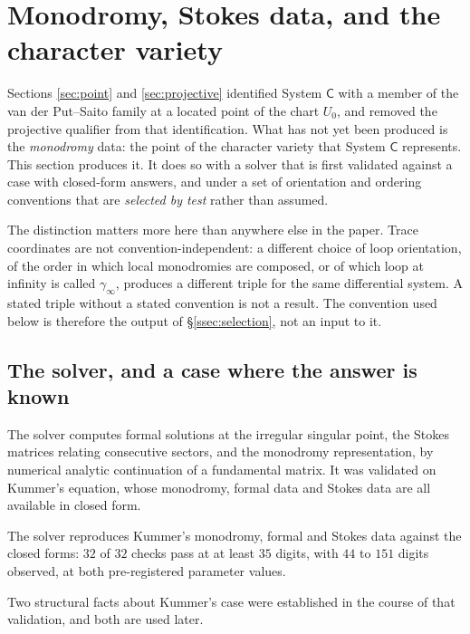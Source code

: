 \section{Monodromy, Stokes data, and the character variety}\label{sec:monodromy}

Sections \ref{sec:point} and \ref{sec:projective} identified System $\mathsf C$
with a member of the van der Put--Saito family at a located point of the chart
$U_0$, and removed the projective qualifier from that identification. What has
not yet been produced is the \emph{monodromy} data: the point of the character
variety that System $\mathsf C$ represents. This section produces it. It does
so with a solver that is first validated against a case with closed-form
answers, and under a set of orientation and ordering conventions that are
\emph{selected by test} rather than assumed.

The distinction matters more here than anywhere else in the paper. Trace
coordinates are not convention-independent: a different choice of loop
orientation, of the order in which local monodromies are composed, or of which
loop at infinity is called $\gamma_\infty$, produces a different triple for the
same differential system. A stated triple without a stated convention is not a
result. The convention used below is therefore the output of
\S\ref{ssec:selection}, not an input to it.

\subsection{The solver, and a case where the answer is
known}\label{ssec:kummer}

The solver computes formal solutions at the irregular singular point, the
Stokes matrices relating consecutive sectors, and the monodromy
representation, by numerical analytic continuation of a fundamental matrix. It
was validated on Kummer's equation, whose monodromy, formal data and Stokes
data are all available in closed form.

\begin{remark}
The solver reproduces Kummer's monodromy, formal and Stokes data against the
closed forms: $32$ of $32$ checks pass at at least $35$ digits, with $44$ to
$151$ digits observed, at both pre-registered parameter values.
\end{remark}

Two structural facts about Kummer's case were established in the course of that
validation, and both are used later.

